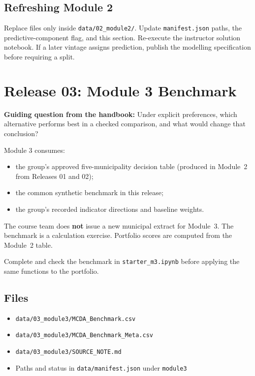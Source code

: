 \documentclass[11pt,a4paper]{article}
\begin{document}
\subsection*{Refreshing Module 2}

Replace files only inside \texttt{data/02\_module2/}. Update
\texttt{manifest.json} paths, the predictive-component flag, and this
section. Re-execute the instructor solution notebook. If a later
vintage assigns prediction, publish the modelling specification
before requiring a split.

\section{Release 03: Module 3 Benchmark}

\textbf{Guiding question from the handbook:}
Under explicit preferences, which alternative performs best in a
checked comparison, and what would change that conclusion?

Module 3 consumes:
\begin{itemize}
    \item the group's approved five-municipality decision table
    (produced in Module~2 from Releases 01 and 02);
    \item the common synthetic benchmark in this release;
    \item the group's recorded indicator directions and baseline
    weights.
\end{itemize}

The course team does \textbf{not} issue a new municipal extract for
Module~3. The benchmark is a calculation exercise. Portfolio scores
are computed from the Module~2 table.

Complete and check the benchmark in \texttt{starter\_m3.ipynb} before
applying the same functions to the portfolio.

\subsection*{Files}

\begin{itemize}
    \item \texttt{data/03\_module3/MCDA\_Benchmark.csv}
    \item \texttt{data/03\_module3/MCDA\_Benchmark\_Meta.csv}
    \item \texttt{data/03\_module3/SOURCE\_NOTE.md}
    \item Paths and status in \texttt{data/manifest.json} under
    \texttt{module3}
\end{itemize}
\end{document}
